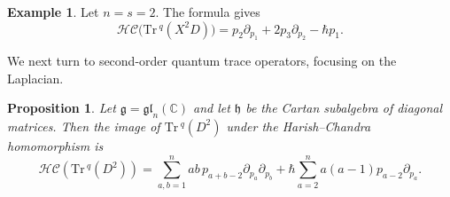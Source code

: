 \documentclass[11pt,reqno]{amsart}
\newtheorem{proposition}[theorem]{Proposition}
\theoremstyle{definition}
\newtheorem{example}[theorem]{Example}
\newcommand{\bbC}{\mathbb{C}}
\newcommand{\gl}{\mathfrak{gl}}
\newcommand{\Tr}{\mathrm{Tr} \,}
\newcommand{\fkg}{\mathfrak{g}}
\newcommand{\fkh}{\mathfrak{h}}
\newcommand{\hc}{\mathcal{HC}}
\begin{document}
\begin{example}
Let \(n=s=2\).  The formula gives
\[
   \hc\bigl(\Tr^q(X^2D)\bigr)
   =
   p_2\partial_{p_1}
   +
   2p_3\partial_{p_2}
   -
   \hbar p_1.
\]


\end{example}


We next turn to second-order quantum trace operators, focusing on the Laplacian.

\begin{proposition}
Let \(\fkg = \gl_n (\bbC)\) and let \(\fkh\) be the Cartan subalgebra of diagonal matrices. 
Then the image of \(\Tr^q(D^2)\) under the Harish--Chandra homomorphism is
\begin{equation}
		\hc(\Tr^q(D^2))
	   =\sum_{a,b=1}^n
	   ab\,p_{a+b-2}
	   \partial_{p_a}\partial_{p_b}
	   +
	   \hbar
	   \sum_{a=2}^n
	   a(a-1)p_{a-2}\partial_{p_a}.
\end{equation}
\end{proposition}
\end{document}
